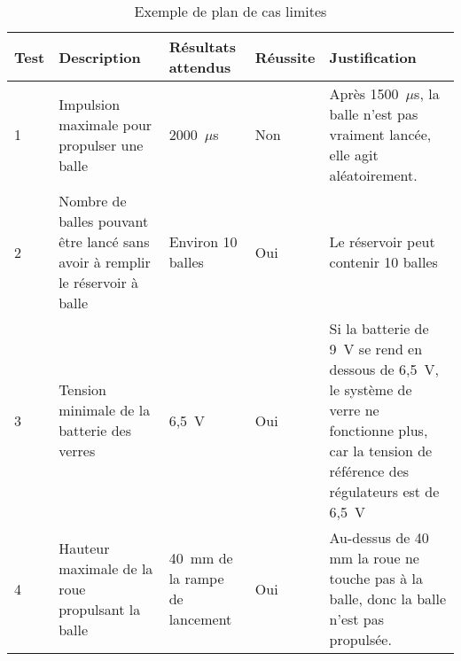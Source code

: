 \begin{landscape}
    \begin{table}[h!]
        \centering
        \caption{Exemple de plan de cas limites}
        \begin{tabular}{p{0.5in}p{2in}p{1.5in}p{0.75in}p{3in}}
            \hline
            \bfseries Test & \bfseries Description & \bfseries Résultats attendus & \bfseries Réussite & \bfseries Justification \\
            \hline\hline
            1 & Impulsion maximale pour propulser une balle & 2000~$\mu$s & Non & Après 1500~$\mu$s, la balle n’est pas vraiment lancée, elle agit aléatoirement. \\
            2 & Nombre de balles pouvant être lancé sans avoir à remplir le réservoir à balle & Environ 10 balles & Oui & Le réservoir peut contenir 10 balles \\
            3 & Tension minimale de la batterie des verres & 6,5~V & Oui & Si la batterie de 9~V se rend en dessous de 6,5~V, le système de verre ne fonctionne plus, car la tension de référence des régulateurs est de 6,5~V \\
            4 & Hauteur maximale de la roue propulsant la balle & 40~mm de la rampe de lancement & Oui & Au-dessus de 40 mm la roue ne touche pas à la balle, donc la balle n’est pas propulsée. \\
            \hline
        \end{tabular}
        \label{tab:s3-test-cas-limites}
    \end{table}
\end{landscape}
